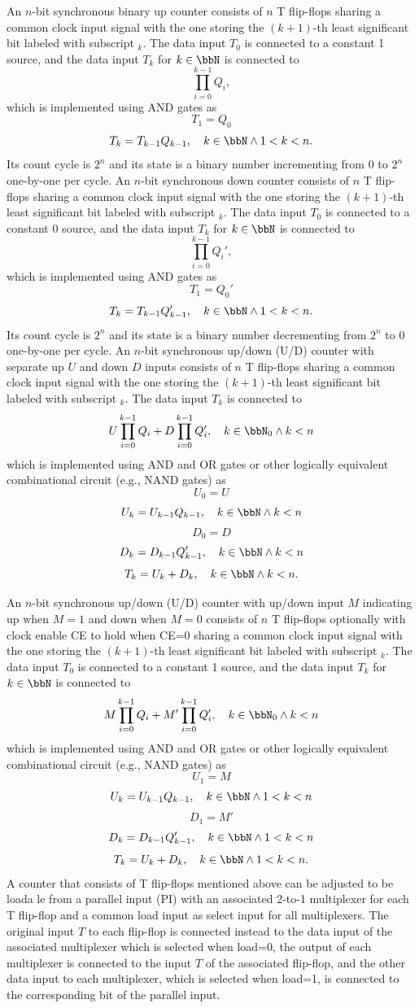 \documentclass[a4paper,12pt]{report}
\begin{document}
An $n$-bit synchronous binary up counter consists of $n$ T flip-flops sharing a common clock input signal with the one storing the $(k+1)$-th least significant bit labeled with subscript $_k$. The data input $T_0$ is connected to a constant 1 source, and the data input $T_k$ for $k\in\bbN$ is connected to
\[\prod_{i=0}^{k-1}Q_i,\]
which is implemented using AND gates as
\[T_1=Q_0\]
\[T_k=T_{k-1}Q_{k-1},\quad k\in\bbN\land 1<k<n.\]
Its count cycle is $2^n$ and its state is a binary number incrementing from 0 to $2^n$ one-by-one per cycle.
An $n$-bit synchronous down counter consists of $n$ T flip-flops sharing a common clock input signal with the one storing the $(k+1)$-th least significant bit labeled with subscript $_k$. The data input $T_0$ is connected to a constant 0 source, and the data input $T_k$ for $k\in\bbN$ is connected to
\[\prod_{i=0}^{k-1}Q_i',\]
which is implemented using AND gates as
\[T_1=Q_0'\]
\[T_k=T_{k-1}Q_{k-1}',\quad k\in\bbN\land 1<k<n.\]
Its count cycle is $2^n$ and its state is a binary number decrementing from $2^n$ to 0 one-by-one per cycle.
An $n$-bit synchronous up/down (U/D) counter with separate up $U$ and down $D$ inputs consists of $n$ T flip-flops sharing a common clock input signal with the one storing the $(k+1)$-th least significant bit labeled with subscript $_k$. The data input $T_k$ is connected to
\[U\prod_{i=0}^{k-1}Q_i+D\prod_{i=0}^{k-1}Q_i',\quad k\in\bbN_0\land k<n\]
which is implemented using AND and OR gates or other logically equivalent combinational circuit (e.g., NAND gates) as
\[U_0=U\]
\[U_k=U_{k-1}Q_{k-1},\quad k\in\bbN\land k<n\]
\[D_0=D\]
\[D_k=D_{k-1}Q_{k-1}',\quad k\in\bbN\land k<n\]
\[T_k=U_k+D_k,\quad k\in\bbN\land k<n.\]

An $n$-bit synchronous up/down (U/D) counter with up/down input $M$ indicating up when $M=1$ and down when $M=0$ consists of $n$ T flip-flops optionally with clock enable CE to hold when CE=0 sharing a common clock input signal with the one storing the $(k+1)$-th least significant bit labeled with subscript $_k$. The data input $T_0$ is connected to a constant 1 source, and the data input $T_k$ for $k\in\bbN$ is connected to
\[M\prod_{i=0}^{k-1}Q_i+M'\prod_{i=0}^{k-1}Q_i',\quad k\in\bbN_0\land k<n\]
which is implemented using AND and OR gates or other logically equivalent combinational circuit (e.g., NAND gates) as
\[U_1=M\]
\[U_k=U_{k-1}Q_{k-1},\quad k\in\bbN\land 1<k<n\]
\[D_1=M'\]
\[D_k=D_{k-1}Q_{k-1}',\quad k\in\bbN\land 1<k<n\]
\[T_k=U_k+D_k,\quad k\in\bbN\land 1<k<n.\]
A counter that consists of T flip-flops mentioned above can be adjusted to be loada le from a parallel input (PI) with an associated 2-to-1 multiplexer for each T flip-flop and a common load input as select input for all multiplexers. The original input $T$ to each flip-flop is connected instead to the data input of the associated multiplexer which is selected when load=0, the output of each multiplexer is connected to the input $T$ of the associated flip-flop, and the other data input to each multiplexer, which is selected when load=1, is connected to the corresponding bit of the parallel input.
\end{document}
